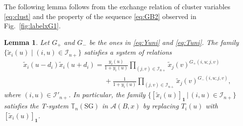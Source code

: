 \documentclass[pdftex]{sigma}
\numberwithin{equation}{section}
\newtheorem{Lemma}[Theorem]{Lemma}
\theoremstyle{definition}
\begin{document}
The following lemma follows from the exchange relation
of
cluster variables \eqref{eq:clust}
and the property of the sequence \eqref{eq:GB2}
 observed in Fig.~\ref{fig:labelxG1}.

\begin{Lemma}
\label{lem:Gx2}
Let $G_+$ and $G_-$ be the ones in \eqref{eq:Yuni} and \eqref{eq:Tuni}.
The family $\{\tilde{x}_i(u)
\mid (i,u)\in \mathcal{I}_{n+}\}$
satisfies a system of relations
\begin{gather}
\tilde{x}_i\left(u-d_i\right)
\tilde{x}_i\left(u+d_i\right)
 =
\frac{y_i(u)}{1+y_i(u)}
\prod_{(j,v)\in \mathcal{I}_{n+}}
\tilde{x}_j(v)^{G_+(i,u;j,v)}
\nonumber\\
\phantom{\tilde{x}_i\left(u-d_i\right)
\tilde{x}_i\left(u+d_i\right)
 =}{}
+
\frac{1}{1+y_i(u)}
\prod_{(j,v)\in \mathcal{I}_{n+}}
\tilde{x}_j(v)^{G_-(i,u;j,v)},\label{eq:xy1}
\end{gather}
where $(i,u)\in \mathcal{I}'_{n+}$.
In particular,
the family $\{ [\tilde{x}_i(u)]_{\mathbf{1}}
\,|\, (i,u)\in \mathcal{I}_{n+}\}$
satisfies the T-system $\mathbb{T}_{n}(\mathrm{SG})$
in $\mathcal{A}(B,x)$
by replacing $T_i(u)$ with $[\tilde{x}_i(u)]_{\mathbf{1}}$.
\end{Lemma}
\end{document}
